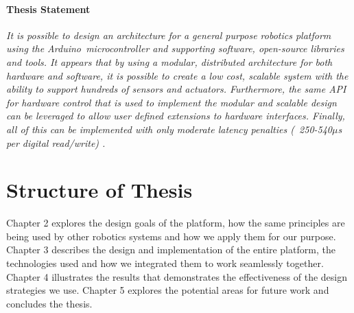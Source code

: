\paragraph*{Thesis Statement}
\textit{It is possible to design an architecture for a general purpose robotics platform using the Arduino\texttrademark\ microcontroller and supporting software, open-source libraries and tools. It appears that by using a modular, distributed architecture for both hardware and software, it is possible to create a low cost, scalable system with the ability to support hundreds of sensors and actuators. Furthermore, the same API for hardware control that is used to implement the modular and scalable design can be leveraged to allow user defined extensions to hardware interfaces. Finally, all of this can be implemented with only moderate latency penalties (~250-540$\mu$s per digital read/write) .} 


\section{Structure of Thesis}
Chapter 2 explores the design goals of the \xten platform, how the same principles are being used by other robotics systems and how we apply them for our purpose. 
Chapter 3 describes the design and implementation of the entire platform, the technologies used and how we integrated them to work seamlessly together.
Chapter 4 illustrates the results that demonstrates the effectiveness of the design strategies we use.
Chapter 5 explores the potential areas for future work and concludes the thesis.

